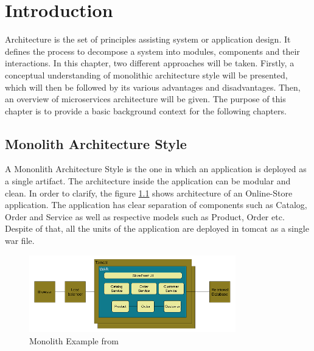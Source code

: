 \chapter{Introduction}\label{chapter:introduction}
Architecture is the set of principles assisting system or application design. \cite{Dashofy:2009aa} It defines the process to decompose a system into modules, components and their interactions. \cite{Brown:2015aa} In this chapter, two different approaches will be taken. Firstly, a conceptual understanding of monolithic architecture style will be presented, which will then be followed by its various advantages and disadvantages. Then, an overview of microservices architecture will be given. The purpose of this chapter is to provide a basic background context for the following chapters.

\section{Monolith Architecture Style}\label{section:context/monolith}
A Mononlith Architecture Style is the one in which an application is deployed as a single artifact. The architecture inside the application can be modular and clean. In order to clarify, the figure \ref{fig:context/monolith-example} shows architecture of an Online-Store application. The application has clear separation of components such as Catalog, Order and Service as well as respective models such as Product, Order etc. Despite of that, all the units of the application are deployed in tomcat as a single war file.\cite{Richardson:2014aa}\cite{Richardson:2014ab}

\begin{figure}[H]
\begin{center}
\includegraphics[width=0.8\textwidth]{figures/context-monolith-example}
\caption{Monolith Example from \cite{Richardson:2014aa}}
\label{fig:context/monolith-example}
\end{center}
\end{figure}

